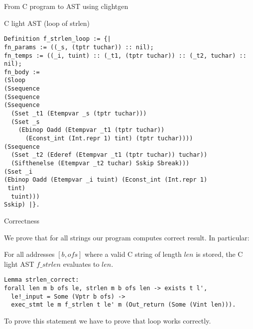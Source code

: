 \documentclass{beamer}
\begin{document}
\begin{frame}{From C program to AST using clightgen}



\end{frame}

\begin{frame}[fragile]{C light AST (loop of strlen)}

\begin{lstlisting}[language=Coq]
Definition f_strlen_loop := {|
fn_params := ((_s, (tptr tuchar)) :: nil);
fn_temps := ((_i, tuint) :: (_t1, (tptr tuchar)) :: (_t2, tuchar) :: nil);
fn_body := 
(Sloop
(Ssequence
(Ssequence
(Ssequence
  (Sset _t1 (Etempvar _s (tptr tuchar)))
  (Sset _s
    (Ebinop Oadd (Etempvar _t1 (tptr tuchar))
      (Econst_int (Int.repr 1) tint) (tptr tuchar))))
(Ssequence
  (Sset _t2 (Ederef (Etempvar _t1 (tptr tuchar)) tuchar))
  (Sifthenelse (Etempvar _t2 tuchar) Sskip Sbreak)))
(Sset _i
(Ebinop Oadd (Etempvar _i tuint) (Econst_int (Int.repr 1)
 tint)
  tuint)))
Sskip) |}.

\end{lstlisting}

\end{frame}

\begin{frame}[fragile]{Correctness}

  We prove that for all strings our program computes correct result. In particular:
  
  \begin{theorem}
    For all addresses $[b, ofs]$ where a valid C string of length $len$ is stored, the C light AST $f\_strlen$ evaluates to $len$.
  \end{theorem}
  
  
  \begin{lstlisting}[language=Coq]
Lemma strlen_correct:
forall len m b ofs le, strlen m b ofs len -> exists t l',
  le!_input = Some (Vptr b ofs) ->
  exec_stmt le m f_strlen t le' m (Out_return (Some (Vint len))).

\end{lstlisting}

To prove this statement we have to prove that loop works correctly.

 



\end{frame}
\end{document}
